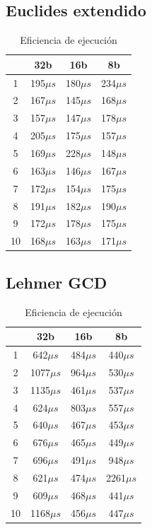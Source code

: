 \subsection{Euclides extendido}
\begin{table}[H]
\label{tablax}
\begin{center}
\begin{tabular}{|c|c|c|c|}
\hline 
 &32b&16b&8b \\
\hline
1 & 195$\mu s$ & 180$\mu s$ & 234$\mu s$ \\ \hline
2& 167$\mu s$& 145$\mu s$ & 168$\mu s$ \\ \hline
3& 157$\mu s$ & 147$\mu s$ & 178$\mu s$ \\ \hline
4& 205$\mu s$ & 175$\mu s$ & 157$\mu s$ \\ \hline
5& 169$\mu s$ & 228$\mu s$ & 148$\mu s$ \\ \hline
6& 163$\mu s$ & 146$\mu s$ & 167$\mu s$ \\ \hline
7& 172$\mu s$ & 154$\mu s$ & 175$\mu s$ \\ \hline
8& 191$\mu s$ & 182$\mu s$ & 190$\mu s$ \\ \hline
9& 172$\mu s$ & 178$\mu s$ & 175$\mu s$ \\ \hline
10& 168$\mu s$ & 163$\mu s$ & 171$\mu s$ \\ \hline
\end{tabular}
\end{center}
\caption{Eficiencia de ejecuci\'on}
\end{table}

\subsection{Lehmer GCD}
\begin{table}[H]
\label{tablax}
\begin{center}
\begin{tabular}{|c|c|c|c|}
\hline 
 &32b&16b&8b \\
\hline
1 & 642$\mu s$ & 484$\mu s$ & 440$\mu s$ \\ \hline
2& 1077$\mu s$& 964$\mu s$ & 530$\mu s$ \\ \hline
3& 1135$\mu s$ & 461$\mu s$ & 537$\mu s$ \\ \hline
4& 624$\mu s$ & 803$\mu s$ & 557$\mu s$ \\ \hline
5& 640$\mu s$ & 467$\mu s$ & 453$\mu s$ \\ \hline
6& 676$\mu s$ & 465$\mu s$ & 449$\mu s$ \\ \hline
7& 696$\mu s$ & 491$\mu s$ & 948$\mu s$ \\ \hline
8& 621$\mu s$ & 474$\mu s$ & 2261$\mu s$ \\ \hline
9& 609$\mu s$ & 468$\mu s$ & 441$\mu s$ \\ \hline
10& 1168$\mu s$ & 456$\mu s$ & 447$\mu s$ \\ \hline
\end{tabular}
\end{center}
\caption{Eficiencia de ejecuci\'on}
\end{table}

